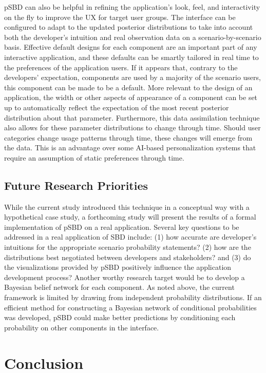 \documentclass[]{article}
\begin{document}
pSBD can also be helpful in refining the application's look, feel, and
interactivity on the fly to improve the UX for target user groups. The
interface can be configured to adapt to the updated posterior
distributions to take into account both the developer's intuition and
real observation data on a scenario-by-scenario basis. Effective default
designs for each component are an important part of any interactive
application, and these defaults can be smartly tailored in real time to
the preferences of the application users. If it appears that, contrary
to the developers' expectation, components are used by a majority of the
scenario users, this component can be made to be a default. More
relevant to the design of an application, the width or other aspects of
appearance of a component can be set up to automatically reflect the
expectation of the most recent posterior distribution about that
parameter. Furthermore, this data assimilation technique also allows for
these parameter distributions to change through time. Should user
categories change usage patterns through time, these changes will emerge
from the data. This is an advantage over some AI-based personalization
systems that require an assumption of static preferences through time.

\subsection{Future Research
Priorities}\label{future-research-priorities}

While the current study introduced this technique in a conceptual way
with a hypothetical case study, a forthcoming study will present the
results of a formal implementation of pSBD on a real application.
Several key questions to be addressed in a real application of SBD
include: (1) how accurate are developer's intuitions for the appropriate
scenario probability statements? (2) how are the distributions best
negotiated between developers and stakeholders? and (3) do the
visualizations provided by pSBD positively influence the application
development process? Another worthy research target would be to develop
a Bayesian belief network for each component. As noted above, the
current framework is limited by drawing from independent probability
distributions. If an efficient method for constructing a Bayesian
network of conditional probabilities was developed, pSBD could make
better predictions by conditioning each probability on other components
in the interface.

\section{Conclusion}\label{conclusion}
\end{document}
